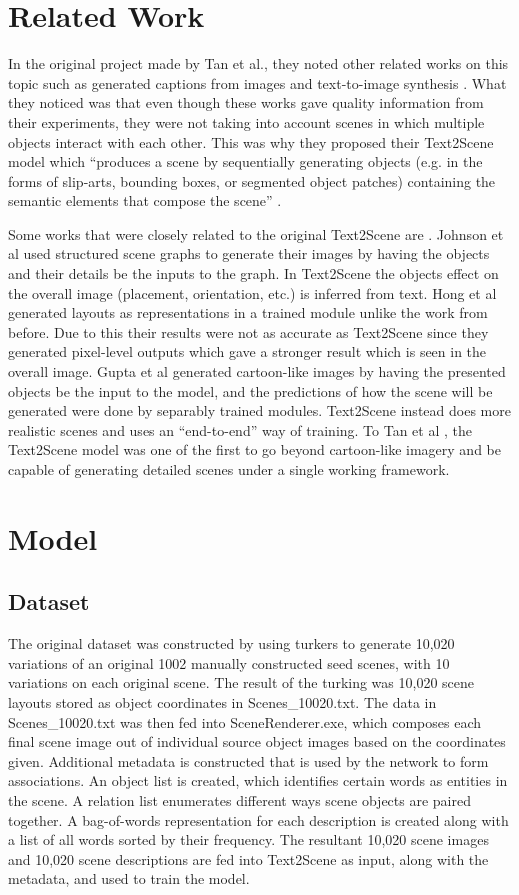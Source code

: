 \documentclass[10pt,twocolumn,letterpaper]{article}
\begin{document}
\section{Related Work}
In the original project made by Tan et al.\cite{1}, they noted other related works on this topic such as generated captions from images \cite{4, 5} and text-to-image synthesis \cite{6, 7}. What they noticed was that even though these works gave quality information from their experiments, they were not taking into account scenes in which multiple objects interact with each other. This was why they proposed their Text2Scene model which “produces a scene by sequentially generating objects (e.g. in the forms of slip-arts, bounding boxes, or segmented object patches) containing the semantic elements that compose the scene” \cite{1}. \par
Some works that were closely related to the original Text2Scene are \cite{8, 9, 10}. Johnson et al \cite{8} used structured scene graphs to generate their images by having the objects and their details be the inputs to the graph. In Text2Scene the objects effect on the overall image (placement, orientation, etc.) is inferred from text. Hong et al \cite{9} generated layouts as representations in a trained module unlike the work from before. Due to this their results were not as accurate as Text2Scene since they generated pixel-level outputs which gave a stronger result which is seen in the overall image. Gupta et al \cite{10} generated cartoon-like images by having the presented objects be the input to the model, and the predictions of how the scene will be generated were done by separably trained modules. Text2Scene instead does more realistic scenes and uses an “end-to-end”\cite{1} way of training. To Tan et al \cite{1}, the Text2Scene model was one of the first to go beyond cartoon-like imagery and be capable of generating detailed scenes under a single working framework.

\section{Model}
\subsection{Dataset}
The original dataset was constructed by using turkers to generate 10,020 variations of an original 1002 manually constructed seed scenes, with 10 variations on each original scene. The result of the turking was 10,020 scene layouts stored as object coordinates in Scenes\_10020.txt. The data in Scenes\_10020.txt was then fed into SceneRenderer.exe, which composes each final scene image out of individual source object images based on the coordinates given. Additional metadata is constructed that is used by the network to form associations. An object list is created, which identifies certain words as entities in the scene. A relation list enumerates different ways scene objects are paired together. A bag-of-words representation for each description is created along with a list of all words sorted by their frequency. The resultant 10,020 scene images and 10,020 scene descriptions are fed into Text2Scene as input, along with the metadata, and used to train the model.
\end{document}
